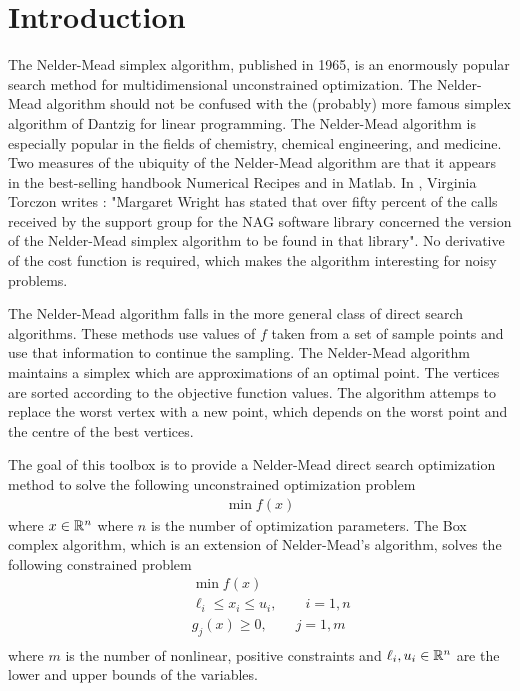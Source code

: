 \chapter{Introduction}

The Nelder-Mead simplex algorithm, published in 1965, is an enormously 
popular search method for multidimensional unconstrained optimization. 
The Nelder-Mead algorithm should not be confused with the (probably) 
more famous simplex algorithm of Dantzig for linear programming. The 
Nelder-Mead algorithm is especially popular in the fields of chemistry, 
chemical engineering, and medicine. Two measures of the ubiquity of the 
Nelder-Mead algorithm are that it appears in the best-selling handbook 
Numerical Recipes and in Matlab. In \cite{Torczon89multi-directionalsearch},
Virginia Torczon writes : "Margaret Wright has stated that over
fifty percent of the calls received by the support group for the NAG
software library concerned the version of the Nelder-Mead 
simplex algorithm to be found in that library". No derivative of the cost function is 
required, which makes the algorithm interesting for noisy problems.

The Nelder-Mead algorithm falls in the more general class of direct 
search algorithms. These methods use values of $f$ taken from a set of 
sample points and use that information to continue the sampling. The 
Nelder-Mead algorithm maintains a simplex which are approximations of an 
optimal point. The vertices are sorted according to the objective 
function values. The algorithm attemps to replace the worst vertex with 
a new point, which depends on the worst point and the centre of the best 
vertices. 

The goal of this toolbox is to provide a Nelder-Mead direct search optimization method to solve the 
following unconstrained optimization problem
\begin{eqnarray}
\min f(x)
\end{eqnarray}
where $x\in \mathbb{R}^n$ where $n$ is the number of optimization parameters.
The Box complex algorithm, which is an extension of Nelder-Mead's algorithm, solves the 
following constrained problem
\begin{eqnarray}
&&\min f(x)\\
&&\ell_i \leq x_i \leq u_i, \qquad i = 1,n\\
&&g_j(x)\geq 0, \qquad j = 1, m\\
\end{eqnarray}
where $m$ is the number of nonlinear, positive constraints and $\ell_i,u_i\in \mathbb{R}^n$ are the lower 
and upper bounds of the variables.

